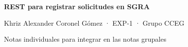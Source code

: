 \documentclass[11pt,a4paper]{article}
\begin{document}
\begin{center}
{\Large\bfseries REST para registrar solicitudes en SGRA}\par
Khriz Alexander Coronel Gómez · EXP-1 · Grupo CCEG\par
Notas individuales para integrar en las notas grupales
\end{center}

\end{document}

